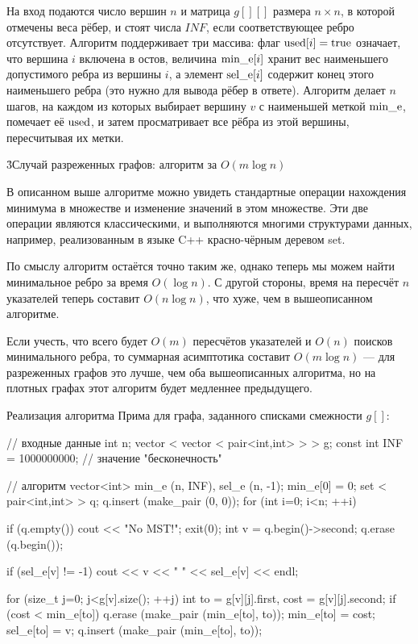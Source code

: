 На вход подаются число вершин $n$ и матрица $g[][]$ размера $n \times n$, в которой отмечены веса рёбер, и стоят числа $INF$, если соответствующее ребро отсутствует. Алгоритм поддерживает три массива: флаг ${\rm used}[i] = {\rm true}$ означает, что вершина $i$ включена в остов, величина ${\rm min\_e}[i]$ хранит вес наименьшего допустимого ребра из вершины $i$, а элемент ${\rm sel\_e}[i]$ содержит конец этого наименьшего ребра (это нужно для вывода рёбер в ответе). Алгоритм делает $n$ шагов, на каждом из которых выбирает вершину $v$ с наименьшей меткой ${\rm min\_e}$, помечает её $\rm used$, и затем просматривает все рёбра из этой вершины, пересчитывая их метки.


\h3{Случай разреженных графов: алгоритм за $O(m \log n)$}

В описанном выше алгоритме можно увидеть стандартные операции нахождения минимума в множестве и изменение значений в этом множестве. Эти две операции являются классическими, и выполняются многими структурами данных, например, реализованным в языке C++ красно-чёрным деревом set.

По смыслу алгоритм остаётся точно таким же, однако теперь мы можем найти минимальное ребро за время $O(\log n)$. С другой стороны, время на пересчёт $n$ указателей теперь составит $O(n \log n)$, что хуже, чем в вышеописанном алгоритме.

Если учесть, что всего будет $O(m)$ пересчётов указателей и $O(n)$ поисков минимального ребра, то суммарная асимптотика составит $O(m \log n)$ --- для разреженных графов это лучше, чем оба вышеописанных алгоритма, но на плотных графах этот алгоритм будет медленнее предыдущего.

Реализация алгоритма Прима для графа, заданного списками смежности $g[]$:

\code
// входные данные
int n;
vector < vector < pair<int,int> > > g;
const int INF = 1000000000; // значение "бесконечность"

// алгоритм
vector<int> min_e (n, INF), sel_e (n, -1);
min_e[0] = 0;
set < pair<int,int> > q;
q.insert (make_pair (0, 0));
for (int i=0; i<n; ++i) {
	if (q.empty()) {
		cout << "No MST!";
		exit(0);
	}
	int v = q.begin()->second;
	q.erase (q.begin());

	if (sel_e[v] != -1)
		cout << v << " " << sel_e[v] << endl;

	for (size_t j=0; j<g[v].size(); ++j) {
		int to = g[v][j].first,
			cost = g[v][j].second;
		if (cost < min_e[to]) {
			q.erase (make_pair (min_e[to], to));
			min_e[to] = cost;
			sel_e[to] = v;
			q.insert (make_pair (min_e[to], to));
		}
	}
}
\endcode


